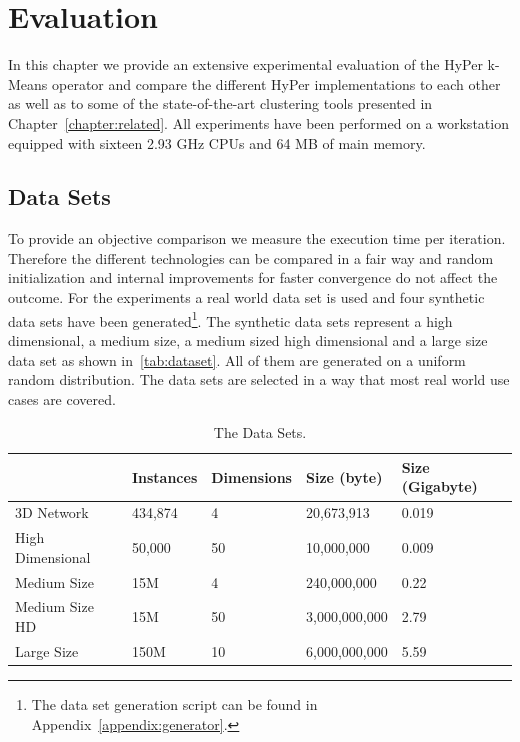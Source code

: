 \chapter{Evaluation}\label{chapter:evaluation}

In this chapter we provide an extensive experimental evaluation of the HyPer k-Means operator and compare the different HyPer implementations to each other as well as to some of the state-of-the-art clustering tools presented in Chapter~\ref{chapter:related}. All experiments have been performed on a workstation equipped with sixteen 2.93 GHz CPUs and 64 MB of main memory.


\section{Data Sets}
To provide an objective comparison we measure the execution time per iteration. Therefore the different technologies can be compared in a fair way and random initialization and internal improvements for faster convergence do not affect the outcome. For the experiments a real world data set is used and four synthetic data sets have been generated\footnote{The data set generation script can be found in Appendix~\ref{appendix:generator}.}. The synthetic data sets represent a high dimensional, a medium size, a medium sized high dimensional and a large size data set as shown in~\autoref{tab:dataset}. All of them are generated on a uniform random distribution. The data sets are selected in a way that most real world use cases are covered.

\begin{table}[htsb]
  \caption[The Data Sets]{The Data Sets.}\label{tab:dataset}
  \centering
  \begin{tabular}{l l l l l}
    \toprule
      & Instances & Dimensions & Size (byte) & Size (Gigabyte) \\
    \midrule
      3D Network        & 434,874    & 4     & 20,673,913 & 0.019 \\
      High Dimensional  & 50,000     & 50    & 10,000,000 & 0.009 \\
      Medium Size       & 15M       & 4     & 240,000,000 & 0.22 \\
      Medium Size HD    & 15M       & 50    & 3,000,000,000 & 2.79 \\
      Large Size        & 150M      & 10    & 6,000,000,000 & 5.59 \\
    \bottomrule
  \end{tabular}
\end{table}



